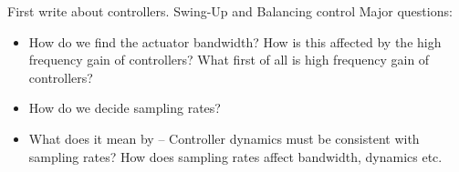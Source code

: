 First write about controllers. Swing-Up and Balancing control
Major questions:
\begin{itemize}
    \item How do we find the actuator bandwidth? How is this affected by the high frequency gain of controllers? What first of all is high frequency gain of controllers?
    \item How do we decide sampling rates? 
    \item What does it mean by -- Controller dynamics must be consistent with sampling rates? How does sampling rates affect bandwidth, dynamics etc. 
    
\end{itemize}
